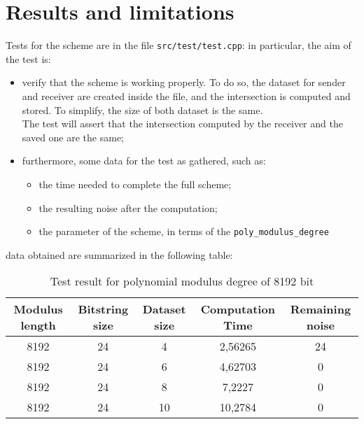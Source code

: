 \documentclass[10pt]{extarticle}
\begin{document}
\section{Results and limitations}
Tests for the scheme are in the file \texttt{src/test/test.cpp}: in particular, the aim of the test is:
\begin{itemize}
    \item verify that the scheme is working properly. To do so, the dataset for sender and receiver are created inside the file, and the intersection is computed and stored. To simplify, the size of both dataset is the same.\\The test will assert that the intersection computed by the receiver and the saved one are the same;
    \item furthermore, some data for the test as gathered, such as:
        \begin{itemize}
            \item the time needed to complete the full scheme;
            \item the resulting noise after the computation;
            \item the parameter of the scheme, in terms of the \texttt{poly\_modulus\_degree} 
        \end{itemize}
\end{itemize}
data obtained are summarized in the following table:\\
\begin{table}[h]
    \begin{tabular}{||c|c|c|c|c||}
    	\hline
        Modulus length & Bitstring size	& Dataset size	& Computation Time	& Remaining noise\\
        \hline\hline
        8192 & 24 & 4 & 2,56265 & 24\\
        \hline
        8192 & 24 & 6 & 4,62703	& 0 \\
        \hline
        8192 & 24 & 8 & 7,2227 & 0 \\
        \hline
        8192 & 24 & 10 & 10,2784 & 0 \\
        \hline
    \end{tabular}
	\caption{Test result for polynomial modulus degree of 8192 bit}
\end{table}
\end{document}
